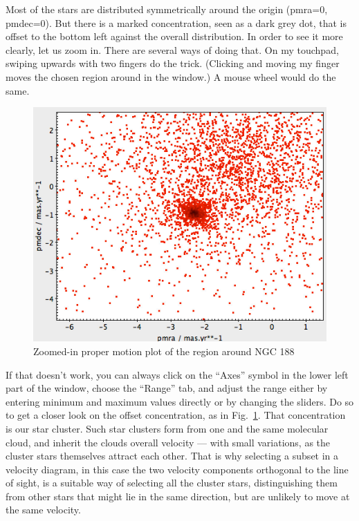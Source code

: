 \documentclass[twocolumn,apj]{openjournal}
\begin{document}
Most of the stars are distributed symmetrically around the origin (pmra=0, pmdec=0). But there is a marked concentration, seen as a dark grey dot, that is offset to the bottom left against the overall distribution. In order to see it more clearly, let us zoom in. There are several ways of doing that. On my touchpad, swiping upwards with two fingers do the trick. (Clicking and moving my finger moves the chosen region around in the window.) A mouse wheel would do the same.
\begin{figure}[htbp]
\begin{center}
\includegraphics[width=\linewidth]{ngc188pmZoom.jpg}
\caption{Zoomed-in proper motion plot of the region around NGC 188}
\label{NGC188PMZoom}
\end{center}
\end{figure}
If that doesn't work, you can always click on the ``Axes'' symbol in the lower left part of the window, choose the ``Range'' tab, and adjust the range either by entering minimum and maximum values directly or by changing the sliders. Do so to get a closer look on the offset concentration, as in Fig.~\ref{NGC188PMZoom}. That concentration is our star cluster. Such star clusters form from one and the same molecular cloud, and inherit the clouds overall velocity --- with small variations, as the cluster stars themselves attract each other. That is why selecting a subset in a velocity diagram, in this case the two velocity components orthogonal to the line of sight, is a suitable way of selecting all the cluster stars, distinguishing them from other stars that might lie in the same direction, but are unlikely to move at the same velocity.
\end{document}
